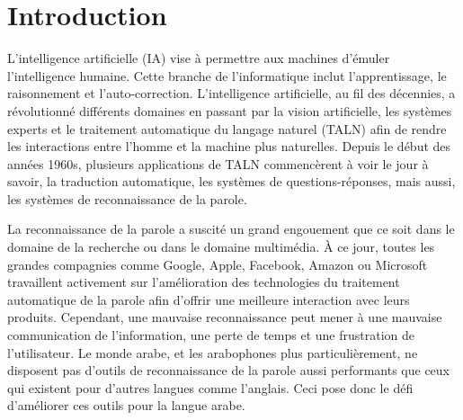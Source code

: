 \chapter*{Introduction} %
L'intelligence artificielle (IA) vise à permettre aux machines d'émuler l'intelligence humaine. Cette branche de l'informatique inclut l’apprentissage, le raisonnement et l’auto-correction. L'intelligence artificielle, au fil des décennies, a révolutionné différents domaines en passant par la vision artificielle, les systèmes experts et le traitement automatique du langage naturel (TALN) afin de rendre les interactions entre l'homme et la machine plus naturelles. Depuis le début des années 1960s, plusieurs applications de TALN commencèrent à voir le jour à savoir, la traduction automatique, les systèmes de questions-réponses, mais aussi, les systèmes de reconnaissance de la parole. 

La reconnaissance de la parole a suscité un grand engouement que ce soit dans le domaine de la recherche ou dans le domaine multimédia. À ce jour, toutes les grandes compagnies comme Google, Apple, Facebook, Amazon ou Microsoft travaillent activement sur l'amélioration des technologies du traitement automatique de la parole afin d'offrir une meilleure interaction avec leurs produits. Cependant, une mauvaise reconnaissance peut mener à une mauvaise communication de l'information, une perte de temps et une frustration de l'utilisateur. Le monde arabe, et les arabophones plus particulièrement, ne disposent pas d'outils de reconnaissance de la parole aussi performants que ceux qui existent pour d'autres langues comme l'anglais. Ceci pose donc le défi d'améliorer ces outils pour la langue arabe. 

